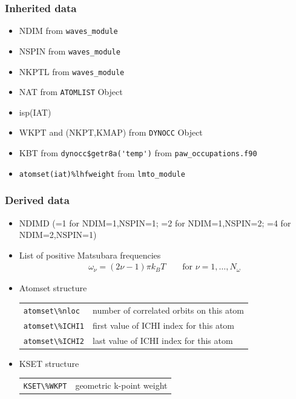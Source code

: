 \documentclass[11pt,a4paper]{report}
\begin{document}
\subsubsection{Inherited data}
\begin{itemize}
\item NDIM from \verb|waves_module|
\item NSPIN from \verb|waves_module|
\item NKPTL from \verb|waves_module|
\item NAT  from \verb|ATOMLIST| Object
\item isp(IAT)
\item WKPT and (NKPT,KMAP) from \verb|DYNOCC| Object
\item KBT from \verb|dynocc$getr8a('temp')| from
  \verb|paw_occupations.f90|
\item \verb|atomset(iat)%lhfweight| from \verb|lmto_module|
\end{itemize}

\subsubsection{Derived data}
\begin{itemize}
\item NDIMD (=1 for NDIM=1,NSPIN=1; =2 for NDIM=1,NSPIN=2; =4 for
  NDIM=2,NSPIN=1)
\item List of positive Matsubara frequencies
\begin{eqnarray}
\omega_\nu=(2\nu-1)\pi k_BT \qquad\text{for $\nu=1,\ldots,N_\omega$}
\end{eqnarray}
\item Atomset structure
\begin{center}
 \begin{tabular}{ll}
 \verb|atomset\%nloc| & number of correlated orbits on this atom \\
\verb|atomset\%ICHI1| & first value of ICHI index for this atom\\
\verb|atomset\%ICHI2| & last value of ICHI index for this atom\\
\end{tabular}
\end{center}
%
\item KSET structure
\begin{center}
 \begin{tabular}{ll}
 \verb|KSET\%WKPT| & geometric k-point weight\\
\end{tabular}
\end{center}
\end{itemize}
\end{document}
